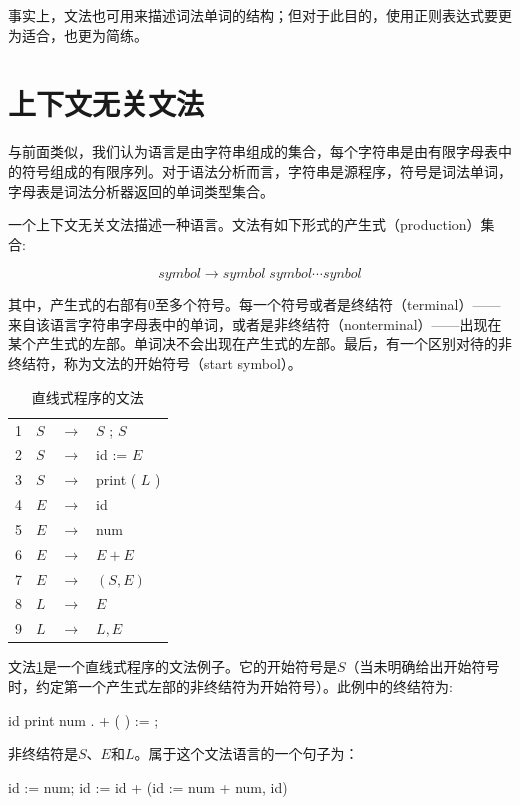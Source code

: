 \documentclass[cn,11pt,chinese]{elegantbook}
\begin{document}
事实上，文法也可用来描述词法单词的结构；但对于此目的，使用正则表达式要更为适合，也更为简练。

\section{上下文无关文法}

与前面类似，我们认为语言是由字符串组成的集合，每个字符串是由有限字母表中的符号组成的有限序列。对于语法分析而言，字符串是源程序，符号是词法单词，字母表是词法分析器返回的单词类型集合。

一个上下文无关文法描述一种语言。文法有如下形式的产生式（production）集合: 

$$
symbol \rightarrow symbol \; symbol \cdots synbol
$$

其中，产生式的右部有0至多个符号。每一个符号或者是终结符（terminal）——来自该语言字符串字母表中的单词，或者是非终结符（nonterminal）——出现在某个产生式的左部。单词决不会出现在产生式的左部。最后，有一个区别对待的非终结符，称为文法的开始符号（start symbol）。

\renewcommand\tablename{文法}
\begin{table}[htbp]
  \centering
  \begin{tabular}{llll}
  \toprule
  1 & $S$ & $\rightarrow$ & $S$ ; $S$ \\
  2 & $S$ & $\rightarrow$ & id := $E$ \\
  3 & $S$ & $\rightarrow$ & print ( $L$ ) \\
  \midrule
  4 & $E$ & $\rightarrow$ & id \\
  5 & $E$ & $\rightarrow$ & num \\
  6 & $E$ & $\rightarrow$ & $E+E$ \\
  7 & $E$ & $\rightarrow$ & $(S,E)$ \\
  \midrule
  8 & $L$ & $\rightarrow$ & $E$ \\
  9 & $L$ & $\rightarrow$ & $L,E$ \\
  \bottomrule
  \end{tabular}
  \caption{直线式程序的文法}\label{grammar:3-1}
\end{table}
\renewcommand\tablename{表}

文法\ref{grammar:3-1}是一个直线式程序的文法例子。它的开始符号是$S$（当未明确给出开始符号时，约定第一个产生式左部的非终结符为开始符号）。此例中的终结符为:

id print num . + ( ) := ;

非终结符是$S$、$E$和$L$。属于这个文法语言的一个句子为：

id := num; id := id + (id := num + num, id)
\end{document}

